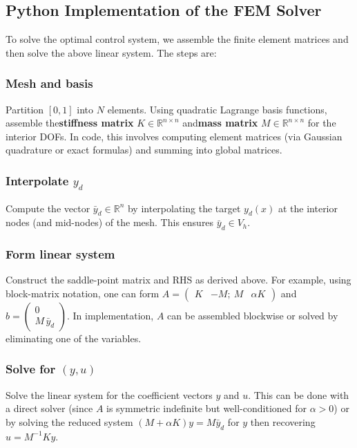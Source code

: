 \documentclass[a4paper,10pt]{report}
\begin{document}
\subsection{Python Implementation of the FEM Solver}
To solve the optimal control system, we assemble the finite element matrices and then solve the above linear system. The steps are:

\subsubsection{Mesh and basis}
Partition \([0,1]\) into \(N\) elements. Using quadratic Lagrange basis functions, assemble the\textbf{stiffness matrix} \(K\in\mathbb{R}^{n\times n}\) and\textbf{mass matrix} \(M\in\mathbb{R}^{n\times n}\) for the interior DOFs. In code, this involves computing element matrices (via Gaussian quadrature or exact formulas) and summing into global matrices.

\subsubsection{Interpolate \(y_d\)}
Compute the vector \(\bar y_d\in\mathbb{R}^n\) by interpolating the target \(y_d(x)\) at the interior nodes (and mid-nodes) of the mesh. This ensures \(\bar y_d \in V_h\).

\subsubsection{Form linear system}
Construct the saddle-point matrix and RHS as derived above. For example, using block-matrix notation, one can form \(A = \begin{pmatrix}K & -M;~M & \alpha K\end{pmatrix}\) and \(b = \begin{pmatrix}0 \\ M\,\bar y_d\end{pmatrix}\). In implementation, \(A\) can be assembled blockwise or solved by eliminating one of the variables.

\subsubsection{Solve for \((y,u)\)}
Solve the linear system for the coefficient vectors \(y\) and \(u\). This can be done with a direct solver (since \(A\) is symmetric indefinite but well-conditioned for \(\alpha>0\)) or by solving the reduced system \((M + \alpha K)y = M\bar y_d\) for \(y\) then recovering \(u = M^{-1}K y\).
\end{document}

